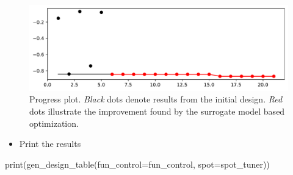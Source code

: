 \documentclass[
  letterpaper,
  DIV=11,
  numbers=noendperiod]{scrreprt}
\newenvironment{Shaded}{\begin{snugshade}}{\end{snugshade}}
\newcommand{\BuiltInTok}[1]{\textcolor[rgb]{0.00,0.23,0.31}{#1}}
\newcommand{\NormalTok}[1]{\textcolor[rgb]{0.00,0.23,0.31}{#1}}
\newcommand{\OperatorTok}[1]{\textcolor[rgb]{0.37,0.37,0.37}{#1}}
\providecommand{\tightlist}{%
  \setlength{\itemsep}{0pt}\setlength{\parskip}{0pt}}\usepackage{longtable,booktabs,array}
\begin{document}
\begin{figure}[H]

{\centering \includegraphics{17_spot_hpt_sklearn_multiclass_classification_xgb_files/figure-pdf/cell-25-output-1.pdf}

}

\caption{Progress plot. \emph{Black} dots denote results from the
initial design. \emph{Red} dots illustrate the improvement found by the
surrogate model based optimization.}

\end{figure}

\begin{itemize}
\tightlist
\item
  Print the results
\end{itemize}

\begin{Shaded}
\begin{Highlighting}[]
\BuiltInTok{print}\NormalTok{(gen\_design\_table(fun\_control}\OperatorTok{=}\NormalTok{fun\_control,}
\NormalTok{    spot}\OperatorTok{=}\NormalTok{spot\_tuner))}
\end{Highlighting}
\end{Shaded}
\end{document}
